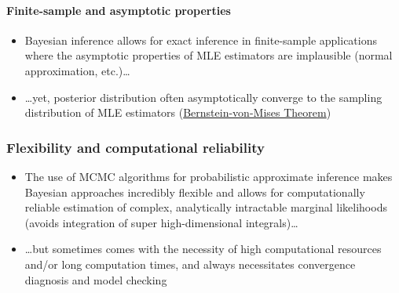 \documentclass[
  11pt,
]{article}
\providecommand{\tightlist}{%
  \setlength{\itemsep}{0pt}\setlength{\parskip}{0pt}}
\begin{document}
\hypertarget{finite-sample-and-asymptotic-properties}{%
\paragraph{Finite-sample and asymptotic properties}\label{finite-sample-and-asymptotic-properties}}

\begin{itemize}
\tightlist
\item
  Bayesian inference allows for exact inference in finite-sample applications where the asymptotic properties of MLE estimators are implausible (normal approximation, etc.)\ldots{}
\item
  \ldots yet, posterior distribution often asymptotically converge to the sampling distribution of MLE estimators (\href{https://en.wikipedia.org/wiki/Bernstein\%E2\%80\%93von_Mises_theorem}{Bernstein-von-Mises Theorem})
\end{itemize}

\hypertarget{flexibility-and-computational-reliability}{%
\subsubsection{Flexibility and computational reliability}\label{flexibility-and-computational-reliability}}

\begin{itemize}
\tightlist
\item
  The use of MCMC algorithms for probabilistic approximate inference makes Bayesian approaches incredibly flexible and allows for computationally reliable estimation of complex, analytically intractable marginal likelihoods (avoids integration of super high-dimensional integrals)\ldots{}
\item
  \ldots but sometimes comes with the necessity of high computational resources and/or long computation times, and always necessitates convergence diagnosis and model checking
\end{itemize}
\end{document}
